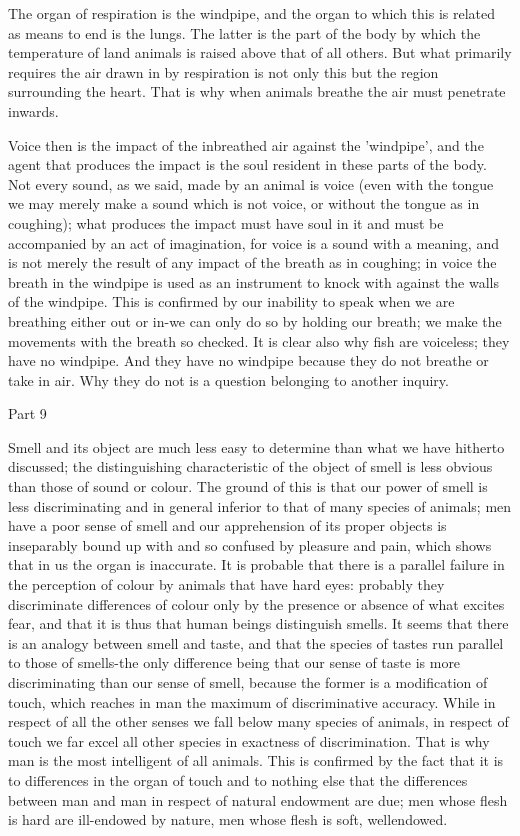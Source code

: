 The organ of respiration is the windpipe, and the organ to which this
is related as means to end is the lungs. The latter is the part of
the body by which the temperature of land animals is raised above
that of all others. But what primarily requires the air drawn in by
respiration is not only this but the region surrounding the heart.
That is why when animals breathe the air must penetrate inwards.

Voice then is the impact of the inbreathed air against the 'windpipe',
and the agent that produces the impact is the soul resident in these
parts of the body. Not every sound, as we said, made by an animal
is voice (even with the tongue we may merely make a sound which is
not voice, or without the tongue as in coughing); what produces the
impact must have soul in it and must be accompanied by an act of imagination,
for voice is a sound with a meaning, and is not merely the result
of any impact of the breath as in coughing; in voice the breath in
the windpipe is used as an instrument to knock with against the walls
of the windpipe. This is confirmed by our inability to speak when
we are breathing either out or in-we can only do so by holding our
breath; we make the movements with the breath so checked. It is clear
also why fish are voiceless; they have no windpipe. And they have
no windpipe because they do not breathe or take in air. Why they do
not is a question belonging to another inquiry. 

Part 9

Smell and its object are much less easy to determine than what we
have hitherto discussed; the distinguishing characteristic of the
object of smell is less obvious than those of sound or colour. The
ground of this is that our power of smell is less discriminating and
in general inferior to that of many species of animals; men have a
poor sense of smell and our apprehension of its proper objects is
inseparably bound up with and so confused by pleasure and pain, which
shows that in us the organ is inaccurate. It is probable that there
is a parallel failure in the perception of colour by animals that
have hard eyes: probably they discriminate differences of colour only
by the presence or absence of what excites fear, and that it is thus
that human beings distinguish smells. It seems that there is an analogy
between smell and taste, and that the species of tastes run parallel
to those of smells-the only difference being that our sense of taste
is more discriminating than our sense of smell, because the former
is a modification of touch, which reaches in man the maximum of discriminative
accuracy. While in respect of all the other senses we fall below many
species of animals, in respect of touch we far excel all other species
in exactness of discrimination. That is why man is the most intelligent
of all animals. This is confirmed by the fact that it is to differences
in the organ of touch and to nothing else that the differences between
man and man in respect of natural endowment are due; men whose flesh
is hard are ill-endowed by nature, men whose flesh is soft, wellendowed.


